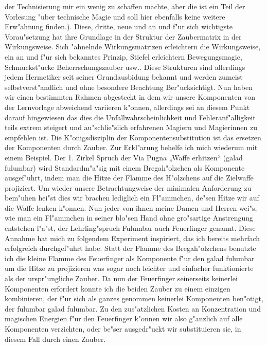 \documentclass[a5paper,8pt]{book}
\begin{document}
der Technisierung mir ein wenig zu schaffen machte, aber die ist ein Teil der Vorlesung "uber technische Magie und soll hier ebenfalls keine weitere Erw"ahnung finden.). Diese, dritte, neue und an und f"ur sich wichtigste Vorau"setzung hat ihre Grundlage in der Struktur der Zaubermatrix in der Wirkungsweise. Sich "ahnelnde Wirkungsmatrizen erleichtern die Wirkungsweise, ein an und f"ur sich bekanntes Prinzip, Stiefel erleichtern Bewegungsmagie, Schmuckst"ucke Beherrschungszauber usw.. Diese Strukturen sind allerdings jedem Hermetiker seit seiner Grundausbidung bekannt und werden zumeist selbstverst"andlich und ohne besondere Beachtung Ber"ucksichtigt.
Nun haben wir einen bestimmten Rahmen abgesteckt in dem wir unsere Komponenten von der Lernvorlage abweichend variieren k"onnen, allerdings sei an diesem Punkt darauf hingewiesen das dies die Unfallwahrscheinlichkeit und Fehleranf"alligkeit teils extrem steigert und au"schlie"slich erfahrenen Magiern und Magierinnen zu empfehlen ist.
Die K"onigsdisziplin der Komponentensubstitution ist das ersetzen der Komponenten durch Zauber. Zur Erkl"arung behelfe ich mich wiederum mit einem Beispiel. Der 1. Zirkel Spruch der Via Pugna „Waffe erhitzen“ (galad fulumbar) wird Standardm"a"sig mit einem Bregah"olzchen als Komponente ausgef"uhrt, indem man die Hitze der Flamme des H"olzchens auf die Zielwaffe projiziert. Um wieder unsere Betrachtungweise der minimalen Anforderung zu bem"uhen hei"st dies wir brachen lediglich ein Fl"ammchen, de"sen Hitze wir auf die Waffe lenken k"onnen. Nun jeder von ihnen meine Damen und Herren wei"s, wie man ein Fl"ammchen in seiner blo"sen Hand ohne gro"sartige Anstrengung entstehen l"a"st, der Lehrling"spruch Fulumbar auch Feuerfinger genannt.
Diese Annahme hat mich zu folgendem Experiment inspiriert, das ich bereits mehrfach erfolgreich durchgef"uhrt habe. Statt der Flamme des Bregah"olzchens benutzte ich die kleine Flamme des Feuerfinger als Komponente f"ur den galad fulumbar um die Hitze zu projizieren was sogar noch leichter und einfacher funktionierte als der urspr"ungliche Zauber. Da nun der Feuerfinger seinerseits keinerlei Komponenten erfordert konnte ich die beiden Zauber zu einem einzigen kombinieren, der f"ur sich als ganzes genommen keinerlei Komponenten ben"otigt, der fulumbar galad fulumbar. Zu den zus"atzlichen Kosten an Konzentration und magischen Energien f"ur den Feuerfinger k"onnen wir also g"anzlich auf alle Komponenten verzichten, oder be"ser ausgedr"uckt wir substituieren sie, in diesem Fall durch einen Zauber.
\end{document}
